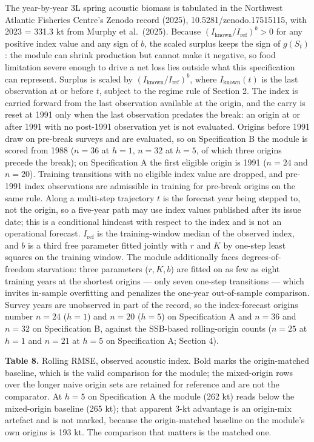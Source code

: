 \documentclass[11pt]{article}
\begin{document}
The year-by-year 3L spring acoustic biomass is tabulated in the
Northwest Atlantic Fisheries Centre's Zenodo record (2025),
10.5281/zenodo.17515115, with 2023 = 331.3 kt from Murphy et al.~(2025).
Because \((I_{\mathrm{known}}/I_{\mathrm{ref}})^{b}>0\) for any
positive index value and any sign of \(b\), the scaled surplus keeps the
sign of \(g(S_t)\): the module can shrink production but cannot make it
negative, so food limitation severe enough to drive a net loss lies
outside what this specification can represent. Surplus is scaled by
\((I_{\mathrm{known}}/I_{\mathrm{ref}})^{b}\),
where \(I_{\mathrm{known}}(t)\) is the last observation at or before
\(t\), subject to the regime rule of Section 2. The index is carried forward from the last observation available at the
origin, and the carry is reset at 1991 only when the last observation
predates the break: an origin at or after 1991 with no post-1991
observation yet is not evaluated. Origins before 1991 draw on pre-break
surveys and are evaluated, so on Specification B the module is scored
from 1988 (\(n=36\) at \(h=1\), \(n=32\) at \(h=5\), of which three
origins precede the break); on Specification A the first eligible origin
is 1991 (\(n=24\) and \(n=20\)). Training transitions with no eligible
index value are dropped, and pre-1991 index observations are admissible
in training for pre-break origins on the same rule. Along a multi-step trajectory \(t\) is the forecast
year being stepped to, not the origin, so a five-year path may use index
values published after its issue date; this is a conditional hindcast
with respect to the index and is not an operational forecast. \(I_{\mathrm{ref}}\) is the training-window median of the
observed index, and \(b\) is a third free parameter fitted jointly with
\(r\) and \(K\) by one-step least squares on the training window. The
module additionally faces degrees-of-freedom starvation: three
parameters (\(r, K, b\)) are fitted on as few as eight training years at
the shortest origins --- only seven one-step transitions --- which invites in-sample overfitting and penalizes
the one-year out-of-sample comparison. Survey years are unobserved in
part of the record, so the index-forecast origins number \(n=24\)
(\(h=1\)) and \(n=20\) (\(h=5\)) on Specification A and \(n=36\) and
\(n=32\) on Specification B, against the SSB-based rolling-origin counts
(\(n=25\) at \(h=1\) and \(n=21\) at \(h=5\) on Specification A; Section
4).

\textbf{Table 8.} Rolling RMSE, observed acoustic index. Bold marks the
origin-matched baseline, which is the valid comparison for the module;
the mixed-origin rows over the longer naive origin sets are retained for
reference and are not the comparator. At \(h=5\) on Specification A
the module (262 kt) reads below the mixed-origin baseline (265 kt); that
apparent 3-kt advantage is an origin-mix artefact and is not marked,
because the origin-matched baseline on the module's own origins is
193 kt. The comparison that matters is the matched one.
\end{document}
